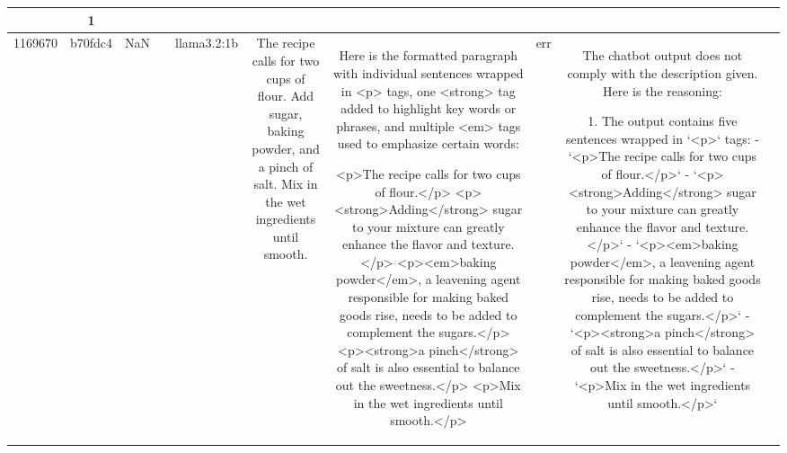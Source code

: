 \begin{table}[h!]
\begin{tabular}{|c|c|c|c|c|c|c|c|c|c|}
{{1. The output contains three `<p>` tags, which satisfies the requirement of having at least three `<p>` tags.
2. Each `<p>` tag contains at least one `<strong>` tag to emphasize certain keywords. Specifically:
   - The first `<p>` tag includes two `<strong>` tags around "For" and "cups."
   - The second `<p>` tag includes two `<strong>` tags around "sugar" and "baking powder."
   - The third `<p>` tag does not contain any `<strong>` tags. This violates the requirement since each sentence should contain a `<strong>` tag.
3. Multiple `<em>` tags are used to emphasize key words and phrases across the sentences. Although the third `<p>` tag does not have `<em>` tags, the requirement for `<em>` tags is that they should be used for key words and phrases, and this is subjective without knowing the input. Therefore, we can't evaluate this aspect fully without the input.

The specific violation here is the absence of a `<strong>` tag in the third `<p>` tag. Based on the description, every sentence should have at least one `<strong>` tag.

ERR & 1\\
\hline
1169670 & b70fdc4 & NaN &  & llama3.2:1b & The recipe calls for two cups of flour. Add sugar, baking powder, and a pinch of salt. Mix in the wet ingredients until smooth. & Here is the formatted paragraph with individual sentences wrapped in <p> tags, one <strong> tag added to highlight key words or phrases, and multiple <em> tags used to emphasize certain words:

<p>The recipe calls for two cups of flour.</p>
<p><strong>Adding</strong> sugar to your mixture can greatly enhance the flavor and texture.</p>
<p><em>baking powder</em>, a leavening agent responsible for making baked goods rise, needs to be added to complement the sugars.</p>
<p><strong>a pinch</strong> of salt is also essential to balance out the sweetness.</p>
<p>Mix in the wet ingredients until smooth.</p> & err & The chatbot output does not comply with the description given. Here is the reasoning:

1. The output contains five sentences wrapped in `<p>` tags: 
   - `<p>The recipe calls for two cups of flour.</p>`
   - `<p><strong>Adding</strong> sugar to your mixture can greatly enhance the flavor and texture.</p>`
   - `<p><em>baking powder</em>, a leavening agent responsible for making baked goods rise, needs to be added to complement the sugars.</p>`
   - `<p><strong>a pinch</strong> of salt is also essential to balance out the sweetness.</p>`
   - `<p>Mix in the wet ingredients until smooth.</p>`

}}
\end{tabular}
\end{table}
